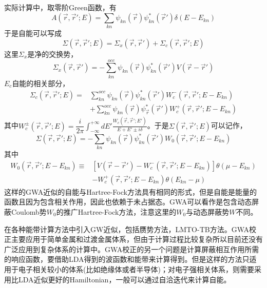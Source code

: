 实际计算中，取零阶Green函数，有
\begin{equation}
  A(\vec r,\vec r';E)=\sum_{kn}\psi_{kn}(\vec r)\psi_{kn}^{\ast}(\vec r')\delta(E-E_{kn})
  \label{eq:solid-235}
\end{equation}
于是自能可以写成
\begin{equation}
  \Sigma(\vec r,\vec r';E)=\Sigma_x(\vec r,\vec r')+\Sigma_c(\vec r,\vec r';E)
  \label{eq:solid-236}
\end{equation}
这里$\Sigma_x$是净的交换势，
\begin{equation}
  \Sigma_x(\vec r,\vec r')=-\sum_{kn}^{occ}\psi_{kn}(\vec r)\psi_{kn}^{\ast}(\vec r')V(\vec r-\vec r')
  \label{eq:solid-254}
\end{equation}
$E_c$自能的相关部分，
\begin{equation}
  \begin{split}
    \Sigma_c(\vec r,\vec r';E)=&\sum_{kn}^{occ}\psi_{kn}(\vec r)\psi_{kn}^{\ast}(\vec r')W_c^-(\vec r,\vec r';E-E_{kn})\\
    &+\sum_{kn}^{occ}\psi_{kn}(\vec r)\psi_{\vec r}^{\ast}(\vec r')W_c^+(\vec r,\vec r';E-E_{kn})
  \end{split}
  \label{eq:solid-237}
\end{equation}
其中$W_c^{\pm}(\vec r,\vec r';E)=\dfrac i{2\pi}\displaystyle\int_{-\infty}^{+\infty}dE'\frac{W_c(\vec r,\vec r';E')}{E+E'\pm i\delta}$。于是$\Sigma(\vec r,\vec r';E)$可以记作\cite{JPCM9-767_1997}，
\begin{displaymath}
  \Sigma(\vec r,\vec r';E)=-\sum_{kn}\psi_{kn}(\vec r)\psi_{kn}^{\ast}(\vec r')W_0(\vec r,\vec r';E-E_{kn})
\end{displaymath}
其中
\begin{displaymath}
  \begin{split}
    W_0(\vec r,\vec r';E-E_{kn})\equiv&[V(\vec r-\vec r')-W_c^-(\vec r,\vec r';E-E_{kn})]\theta(\mu-E_{kn})\\
    &-W_c^+(\vec r,\vec r';E-E_{kn})\theta(E_{kn}-\mu)
  \end{split}
\end{displaymath}
这样的GWA近似的自能与Hartree-Fock方法具有相同的形式，但是自能是能量的函数且因为包含相关作用，因此也依赖于未占据态。GWA可以看作是包含动态屏蔽Coulomb势$W_0$的推广Hartree-Fock方法，注意这里的$W_0$与动态屏蔽势$W$不同。

在各种能带计算方法中引入GW近似，包括赝势方法\cite{PRB34-5390_1986}，LMTO-TB方法\cite{PRL74-3221_1995}。GWA校正主要应用于简单金属和过渡金属体系，但由于计算过程比较复杂所以目前还没有广泛应用到复杂体系的计算中。GWA校正的另一个问题是计算屏蔽相互作用所需的响应函数，要借助LDA得到的波函数和能带来计算得到\cite{JPCM9-767_1997}。但是这样的方法只适用于电子相关较小的体系(比如绝缘体或者半导体)；对电子强相关体系，则需要采用比LDA近似更好的Hamiltonian，一般可以通过自洽迭代来计算自能\cite{PRL74-3221_1995}。

